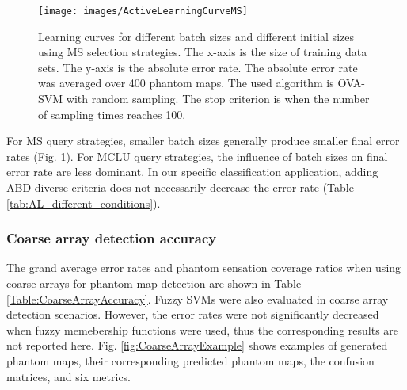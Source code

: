 \begin{figure}[htbp]
    \centering
        \texttt{[image: images/ActiveLearningCurveMS]}
    \caption{Learning curves for different batch sizes and different initial sizes using MS selection strategies. The x-axis is the size of training data sets. The y-axis is the absolute error rate. The absolute error rate was averaged over 400 phantom maps. The used algorithm is OVA-SVM with random sampling. The stop criterion is when the number of sampling times reaches 100. }
    \label{fig:active_learning_curves}
\end{figure} 

For MS query strategies, smaller batch sizes generally produce smaller final error rates (Fig. \ref{fig:active_learning_curves}). For MCLU query strategies, the influence of batch sizes on final error rate are less dominant. In our specific classification application, adding ABD diverse criteria does not necessarily decrease the error rate (Table \ref{tab:AL_different_conditions}).

\subsubsection{Coarse array detection accuracy}
The grand average error rates and phantom sensation coverage ratios when using coarse arrays for phantom map detection are shown in Table \ref{Table:CoarseArrayAccuracy}.
Fuzzy SVMs were also evaluated in coarse array detection scenarios. However, the error rates were not significantly decreased when fuzzy memebership functions were used, thus the corresponding results are not reported here.
Fig. \ref{fig:CoarseArrayExample} shows examples of generated phantom maps, their corresponding predicted phantom maps, the confusion matrices, and six metrics.
           
